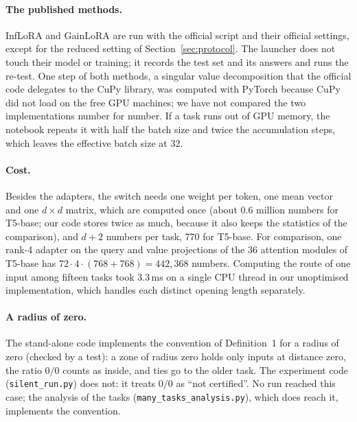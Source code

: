 \paragraph{The published methods.} InfLoRA and GainLoRA are run with the official script and their
official settings, except for the reduced setting of Section~\ref{sec:protocol}. The launcher does
not touch their model or training; it records the test set and its answers and runs the re-test.
One step of both methods, a singular value decomposition that the official code delegates to the
CuPy library, was computed with PyTorch because CuPy did not load on the free GPU machines; we have
not compared the two implementations number for number. If a task runs out of GPU memory, the
notebook repeats it with half the batch size and twice the accumulation steps, which leaves the
effective batch size at 32.

\paragraph{Cost.} Besides the adapters, the switch needs one weight per token, one mean vector and
one $d \times d$ matrix, which are computed once (about 0.6 million numbers for T5-base; our code
stores twice as much, because it also keeps the statistics of the \centre{} comparison), and
$d + 2$ numbers per task, 770 for T5-base. For comparison, one rank-4 adapter on the query and value
projections of the 36 attention modules of T5-base has $72 \cdot 4 \cdot (768 + 768) = 442{,}368$
numbers. Computing the route of one input among fifteen tasks took 3.3\,ms on a single CPU thread
in our unoptimised implementation, which handles each distinct opening length separately.

\paragraph{A radius of zero.} The stand-alone code implements the convention of Definition~1 for a radius of zero (checked by a test): a zone of radius zero holds only inputs at distance zero, the ratio $0/0$ counts as inside, and ties go to the older task. The experiment code (\texttt{silent\_run.py}) does not: it treats $0/0$ as ``not certified''. No run reached this case; the analysis of the \ManyTasks{} tasks (\texttt{many\_tasks\_analysis.py}), which does reach it, implements the convention.

